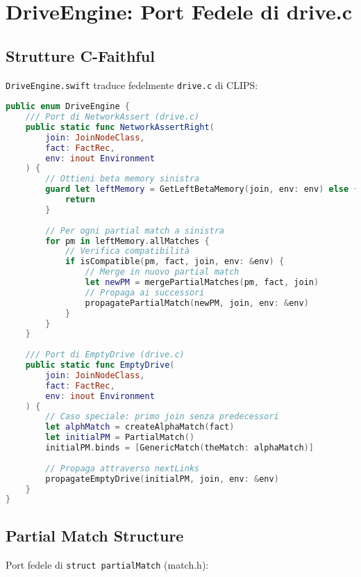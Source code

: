 \section{DriveEngine: Port Fedele di drive.c}

\subsection{Strutture C-Faithful}

\texttt{DriveEngine.swift} traduce fedelmente \texttt{drive.c} di CLIPS:

\begin{lstlisting}[language=Swift]
public enum DriveEngine {
    /// Port di NetworkAssert (drive.c)
    public static func NetworkAssertRight(
        join: JoinNodeClass,
        fact: FactRec,
        env: inout Environment
    ) {
        // Ottieni beta memory sinistra
        guard let leftMemory = GetLeftBetaMemory(join, env: env) else {
            return
        }
        
        // Per ogni partial match a sinistra
        for pm in leftMemory.allMatches {
            // Verifica compatibilità
            if isCompatible(pm, fact, join, env: &env) {
                // Merge in nuovo partial match
                let newPM = mergePartialMatches(pm, fact, join)
                // Propaga ai successori
                propagatePartialMatch(newPM, join, env: &env)
            }
        }
    }
    
    /// Port di EmptyDrive (drive.c)
    public static func EmptyDrive(
        join: JoinNodeClass,
        fact: FactRec,
        env: inout Environment
    ) {
        // Caso speciale: primo join senza predecessori
        let alphMatch = createAlphaMatch(fact)
        let initialPM = PartialMatch()
        initialPM.binds = [GenericMatch(theMatch: alphaMatch)]
        
        // Propaga attraverso nextLinks
        propagateEmptyDrive(initialPM, join, env: &env)
    }
}
\end{lstlisting}

\subsection{Partial Match Structure}

Port fedele di \texttt{struct partialMatch} (match.h):

